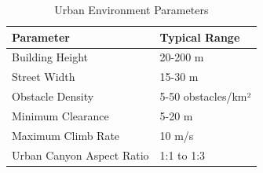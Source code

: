 \documentclass[12pt]{article}
\begin{document}
\begin{table}[h]
\centering
\caption{Urban Environment Parameters}
\begin{tabular}{ll}
\toprule
\textbf{Parameter} & \textbf{Typical Range} \\
\midrule
Building Height & 20-200 m \\
Street Width & 15-30 m \\
Obstacle Density & 5-50 obstacles/km² \\
Minimum Clearance & 5-20 m \\
Maximum Climb Rate & 10 m/s \\
Urban Canyon Aspect Ratio & 1:1 to 1:3 \\
\bottomrule
\end{tabular}
\end{table}
\end{document}
